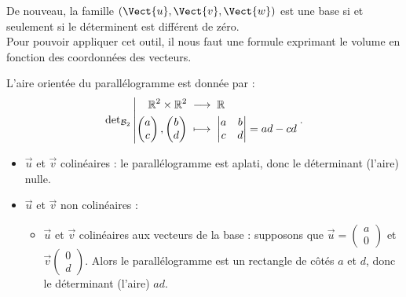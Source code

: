 \documentclass{book}
\begin{document}
\begin{Exemple}
\begin{center}
\end{center} 
De nouveau, la famille $(\Vect{u},\Vect{v},\Vect{w})$ est une base si et seulement si le déterminent est différent de zéro.\\
Pour pouvoir appliquer cet outil, il nous faut une formule exprimant le volume en fonction des coordonnées des vecteurs.
\begin{Proposition}
L'aire orientée du parallélogramme est donnée par :  
$$
{\mathop{\mathrm{det}}\nolimits_{\mathcal{B}_2}}\left|\begin{aligned}{\mathbb{R}^2\times\mathbb{R}^2}&\;\longrightarrow\;{\mathbb{R}}\\{\begin{pmatrix}
a\\c
\end{pmatrix},\begin{pmatrix}
b\\d
\end{pmatrix}}&\;\longmapsto\;{\begin{vmatrix}
a & b \\
c & d
\end{vmatrix}=a d-c d}\end{aligned}\right..
$$
\end{Proposition}
\begin{Demonstration}
\begin{itemize} 
\item $\vec{u}$ et $\vec{v}$ colinéaires :
le parallélogramme est aplati, donc le déterminant (l'aire) nulle.
\item $\vec{u}$ et $\vec{v}$ non colinéaires :
\begin{itemize} 
\item $\vec{u}$ et $\vec{v}$ colinéaires aux vecteurs de la base : supposons que 
$\vec{u}=\left(\begin{smallmatrix}a\\0\end{smallmatrix}\right)$ et
$\vec{v}\left(\begin{smallmatrix}0\\d\end{smallmatrix}\right)$. Alors le parallélogramme est un rectangle de côtés $a$ et $d$, donc le déterminant (l'aire)
$ad$.

\begin{center}
\end{center}
\end{itemize}
\end{itemize}
\end{Demonstration}
\end{Exemple}
\end{document}
